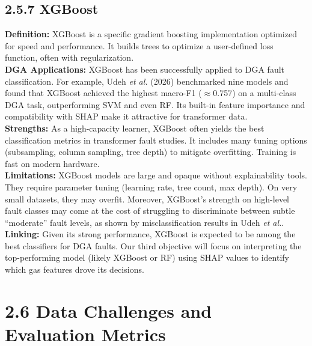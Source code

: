 \subsection{2.5.7 XGBoost}\label{xgboost}

\textbf{Definition:} XGBoost is a specific gradient boosting
implementation optimized for speed and performance. It builds trees to
optimize a user-defined loss function, often with regularization.\\
\textbf{DGA Applications:} XGBoost has been successfully applied to DGA
fault classification. For example, Udeh \emph{et al.} (2026) benchmarked
nine models and found that XGBoost achieved the highest macro-F1
(\(\approx\)0.757) on a multi-class DGA task, outperforming SVM and even RF. Its
built-in feature importance and compatibility with SHAP make it
attractive for transformer data.\\
\textbf{Strengths:} As a high-capacity learner, XGBoost often yields the
best classification metrics in transformer fault studies. It includes
many tuning options (subsampling, column sampling, tree depth) to
mitigate overfitting. Training is fast on modern hardware.\\
\textbf{Limitations:} XGBoost models are large and opaque without
explainability tools. They require parameter tuning (learning rate, tree
count, max depth). On very small datasets, they may overfit. Moreover,
XGBoost's strength on high-level fault classes may come at the cost of
struggling to discriminate between subtle ``moderate'' fault levels, as
shown by misclassification results in Udeh \emph{et al.}.\\
\textbf{Linking:} Given its strong performance, XGBoost is expected to
be among the best classifiers for DGA faults. Our third objective will
focus on interpreting the top-performing model (likely XGBoost or RF)
using SHAP values to identify which gas features drove its decisions.

\section{2.6 Data Challenges and Evaluation
Metrics}\label{data-challenges-and-evaluation-metrics}

